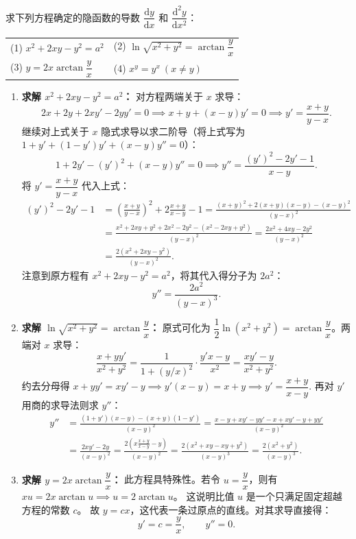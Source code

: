 \documentclass[lang=cn,11pt]{elegantbook}
\begin{document}
\begin{exercise}[单方程隐函数求导]
求下列方程确定的隐函数的导数 $\dfrac{\mathrm{d}y}{\mathrm{d}x}$ 和 $\dfrac{\mathrm{d}^2y}{\mathrm{d}x^2}$：
\begin{tabular}{p{} p{}}
(1) $x^2 + 2xy - y^2 = a^2$ & (2) $\ln\sqrt{x^2+y^2} = \arctan\dfrac{y}{x}$ \\
(3) $y = 2x\arctan\dfrac{y}{x}$ & (4) $x^y = y^x\ (x \neq y)$
\end{tabular}
\end{exercise}
\begin{solution}
\begin{enumerate}
  \item[(1)] \textbf{求解 $x^2 + 2xy - y^2 = a^2$：}
  对方程两端关于 $x$ 求导：
  \[ 2x + 2y + 2xy' - 2yy' = 0 \implies x + y + (x-y)y' = 0 \implies y' = \frac{x+y}{y-x}. \]
  继续对上式关于 $x$ 隐式求导以求二阶导（将上式写为 $1 + y' + (1-y')y' + (x-y)y'' = 0$）：
  \[ 1 + 2y' - (y')^2 + (x-y)y'' = 0 \implies y'' = \frac{(y')^2 - 2y' - 1}{x-y}. \]
  将 $y' = \dfrac{x+y}{y-x}$ 代入上式：
  \begin{align*}
  (y')^2 - 2y' - 1 &= \left(\frac{x+y}{y-x}\right)^2 + 2\frac{x+y}{x-y} - 1 = \frac{(x+y)^2 + 2(x+y)(x-y) - (x-y)^2}{(y-x)^2} \\
  &= \frac{x^2+2xy+y^2 + 2x^2-2y^2 - (x^2-2xy+y^2)}{(y-x)^2} = \frac{2x^2+4xy-2y^2}{(y-x)^2} \\
  &= \frac{2(x^2+2xy-y^2)}{(y-x)^2}.
  \end{align*}
  注意到原方程有 $x^2+2xy-y^2=a^2$，将其代入得分子为 $2a^2$：
  \[ y'' = \frac{2a^2}{(y-x)^3}. \]

  \item[(2)] \textbf{求解 $\ln\sqrt{x^2+y^2} = \arctan\dfrac{y}{x}$：}
  原式可化为 $\dfrac{1}{2}\ln(x^2+y^2) = \arctan\dfrac{y}{x}$。两端对 $x$ 求导：
  \[ \frac{x+yy'}{x^2+y^2} = \frac{1}{1+(y/x)^2} \cdot \frac{y'x - y}{x^2} = \frac{xy'-y}{x^2+y^2}. \]
  约去分母得 $x+yy' = xy'-y \implies y'(x-y) = x+y \implies y' = \dfrac{x+y}{x-y}$.
  再对 $y'$ 用商的求导法则求 $y''$：
  \begin{align*}
  y'' &= \frac{(1+y')(x-y) - (x+y)(1-y')}{(x-y)^2} = \frac{x-y+xy'-yy'-x+xy'-y+yy'}{(x-y)^2} \\
  &= \frac{2xy'-2y}{(x-y)^2} = \frac{2\left(x\frac{x+y}{x-y} - y\right)}{(x-y)^2} = \frac{2(x^2+xy - xy+y^2)}{(x-y)^3} = \frac{2(x^2+y^2)}{(x-y)^3}.
  \end{align*}

  \item[(3)] \textbf{求解 $y = 2x\arctan\dfrac{y}{x}$：}
  此方程具特殊性。若令 $u = \dfrac{y}{x}$，则有 $xu = 2x\arctan u \implies u = 2\arctan u$。
  这说明比值 $u$ 是一个只满足固定超越方程的常数 $c$。
  故 $y = cx$，这代表一条过原点的直线。对其求导直接得：
  \[ y' = c = \frac{y}{x}, \qquad y'' = 0. \]


\end{enumerate}
\end{solution}
\end{document}
